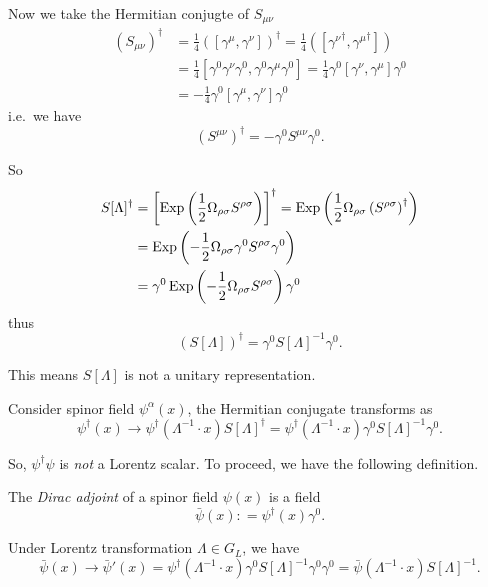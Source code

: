 \documentclass[a4paper,11pt]{article}
\begin{document}
	Now we take the Hermitian conjugte of $S _{\mu \nu}$ 
	\begin{align*}
		(S _{\mu \nu})^{\dagger} & = \frac{1}{4} \left( [\gamma^\mu, \gamma^\nu] \right)^{\dagger} = \frac{1}{4} \left( [{\gamma^\nu}^{\dagger}, {\gamma^\mu}^{\dagger}] \right)\\
		& = \frac{1}{4} [\gamma^0 \gamma^\nu \gamma^0, \gamma^0 \gamma^\mu \gamma^0] = \frac{1}{4} \gamma^0 [\gamma^\nu, \gamma^\mu]\gamma^0\\
		& = - \frac{1}{4} \gamma^0 [\gamma^\mu, \gamma^\nu] \gamma^0
	\end{align*}
	i.e.\ we have
	\[
		(S ^{\mu \nu})^{\dagger} = - \gamma^0 S ^{\mu \nu}\gamma^0.
	\]
	
	So
	\begin{align*}
		S[\Lambda]^{\dagger} & = \left[\operatorname{Exp} \left( \frac{1}{2} \Omega _{\rho \sigma} S ^{\rho \sigma} \right)\right]^{\dagger} = \operatorname{Exp} \left( \frac{1}{2} \Omega _{\rho \sigma} \left( S ^{\rho \sigma} \right)^{\dagger} \right) \\
		& = \operatorname{Exp}\left( - \frac{1}{2} \Omega _{\rho \sigma} \gamma^0 S ^{\rho \sigma} \gamma^0 \right)\\
		& = \gamma^0 \operatorname{Exp} \left( - \frac{1}{2} \Omega _{\rho \sigma} S ^{\rho \sigma} \right) \gamma^0
	\end{align*}
	thus
	\begin{equation}
		\left( S[\Lambda] \right)^{\dagger} = \gamma^0 S[\Lambda]^{-1} \gamma^0.
		\label{eq:4-11}
	\end{equation}

	This means $S[\Lambda]$ is not a unitary representation.

	Consider spinor field $\psi^\alpha(x)$, the Hermitian conjugate transforms as 
	\[
		\psi^{\dagger}(x) \to \psi^{\dagger}(\Lambda^{-1} \cdot x) S[\Lambda]^{\dagger} = \psi^{\dagger} (\Lambda^{-1} \cdot x) \gamma^0 S[\Lambda]^{-1} \gamma^0.
	\]

	So, $\psi^{\dagger} \psi$ is \emph{not} a Lorentz scalar. To proceed, we have the following definition.

	\begin{defi}
		The \emph{Dirac adjoint} of a spinor field $\psi(x)$ is a field 
		\[
			\bar \psi(x) : = \psi^{\dagger}(x) \gamma^0.
		\]
	\end{defi}	

	Under Lorentz transformation $\Lambda \in G_L$, we have
	\[
		\bar \psi(x) \to \bar \psi'(x) = \psi^{\dagger}(\Lambda^{-1} \cdot x) \gamma^0 S[\Lambda]^{-1} \gamma^0 \gamma^0 = \bar \psi(\Lambda^{-1} \cdot x) S[\Lambda]^{-1}.
	\]
\end{document}
